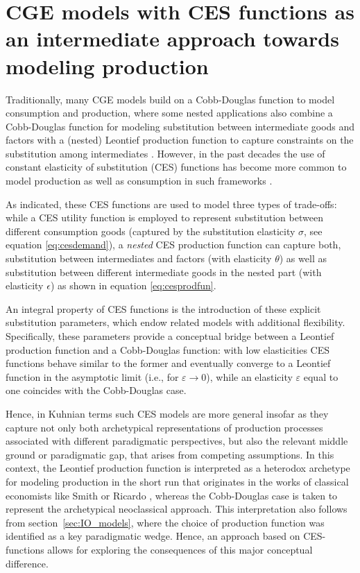 \documentclass{article}
\begin{document}

\section{CGE models with CES functions as an intermediate approach towards modeling production} \label{sec:ces}

Traditionally, many CGE models build on a Cobb-Douglas function to model consumption and production, where some nested applications also combine a Cobb-Douglas function for modeling substitution between intermediate goods and factors with a (nested) Leontief production function to capture constraints on the substitution among intermediates \citep[e.g.][]{GAMS.IO}. However, in the past decades the use of constant elasticity of substitution (CES) functions has become more common to model production as well as consumption in such frameworks \citep{Taylor1990,Klump.2012,Kim.2017}.

As indicated, these CES functions are used to model three types of trade-offs: while a CES utility function is employed to represent substitution between different consumption goods (captured by the substitution elasticity $\sigma$, see equation \eqref{eq:cesdemand}), a \textit{nested} CES production function can capture both, substitution between intermediates and factors (with elasticity $\theta$) as well as substitution between different intermediate goods in the nested part (with elasticity $\epsilon$) as shown in equation \eqref{eq:cesprodfun}.

An integral property of CES functions is the introduction of these explicit substitution parameters, which endow related models with additional flexibility. Specifically, these parameters provide a conceptual bridge between a Leontief production function and a Cobb-Douglas function: with low elasticities CES functions behave similar to the former and eventually converge to a Leontief function in the asymptotic limit (i.e., for $\varepsilon \to 0$), while an elasticity $\varepsilon$ equal to one coincides with the Cobb-Douglas case.

Hence, in Kuhnian terms such CES models are more general insofar as they capture not only both archetypical representations of production processes associated with different paradigmatic perspectives, but also the relevant middle ground or paradigmatic gap, that arises from competing assumptions. In this context, the Leontief production function is interpreted as a heterodox archetype for modeling production in the short run that originates in the works of classical economists like Smith or Ricardo \citep[e.g.][]{Blecker2019}, whereas the Cobb-Douglas case is taken to represent the archetypical neoclassical approach. This interpretation also follows from section~\ref{sec:IO_models}, where the choice of production function was identified as a key paradigmatic wedge. Hence, an approach based on CES-functions allows for exploring the consequences of this major conceptual difference.
\end{document}

